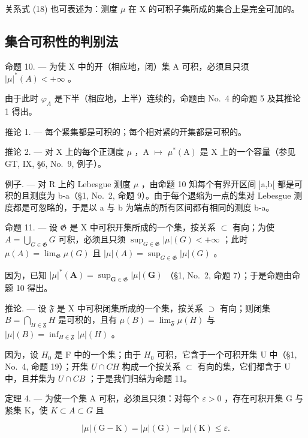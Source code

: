 关系式 (18) 也可表述为：测度 \(\mu\) 在 X 的可积子集所成的集合上是完全可加的。

\subsection{集合可积性的判别法}

命题 10. --- 为使 X 中的开（相应地，闭）集 A 可积，必须且只须 \(|\mu|^{*}(A)<+\infty\) 。

由于此时 \(\varphi_{A}\) 是下半（相应地，上半）连续的，命题由 No.~4 的命题 5 及其推论 1 得出。

推论 1. --- 每个紧集都是可积的；每个相对紧的开集都是可积的。

推论 2. --- 对 X 上的每个正测度 \(\mu\) ，A \(\mapsto\) \(\mu^{*}(\mathrm{A})\) 是 X 上的一个容量（参见 GT, IX, §6, No.~9, 例子）。

例子. --- 对 R 上的 Lebesgue 测度 \(\mu\) ，由命题 10 知每个有界开区间 {]}a,b{[} 都是可积的且测度为 b-a（§1, No.~2, 命题 9）。由于每个退缩为一点的集对 Lebesgue 测度都是可忽略的，于是以 a 与 b 为端点的所有区间都有相同的测度 b-a。

命题 11. --- 设 \(\mathfrak{G}\) 是 X 中可积开集所成的一个集，按关系 \(\subset\) 有向；为使 \(A = \bigcup_{G \in \mathfrak{G}} G\) 可积，必须且只须 \(\sup_{G \in \mathfrak{G}} |\mu|(G) < +\infty\) ；此时 \(\mu(A) = \lim_{\mathfrak{G}} \mu(G)\) 且 \(|\mu|(A) = \sup_{G \in \mathfrak{G}} |\mu|(G)\) 。

因为，已知 \(|\mu|^*(\mathbf{A}) = \sup_{\mathbf{G} \in \mathfrak{G}} |\mu|(\mathbf{G})\) （§1, No.~2, 命题 7）；于是命题由命题 10 得出。

推论. --- 设 \(\mathfrak{F}\) 是 X 中可积闭集所成的一个集，按关系 \(\supset\) 有向；则闭集 \(B = \bigcap_{H \in \mathfrak{F}} H\) 是可积的，且有 \(\mu(B) = \lim_{\mathfrak{F}} \mu(H)\) 与 \(|\mu|(B) = \inf_{H \in \mathfrak{F}} |\mu|(H)\) 。

因为，设 \(H_{0}\) 是 F 中的一个集；由于 \(H_{0}\) 可积，它含于一个可积开集 U 中（§1, No.~4, 命题 19）；开集 \(U \cap CH\) 构成一个按关系 \(\subset\) 有向的集，它们都含于 U 中，且并集为 \(U \cap CB\) ；于是我们归结为命题 11。

定理 4. --- 为使一个集 A 可积，必须且只须：对每个 \(\varepsilon > 0\) ，存在可积开集 G 与紧集 K，使 \(K \subset A \subset G\) 且

\[
| \mu | (\mathrm{G} - \mathrm{K}) = | \mu | (\mathrm{G}) - | \mu | (\mathrm{K}) \leqslant \varepsilon .
\]

